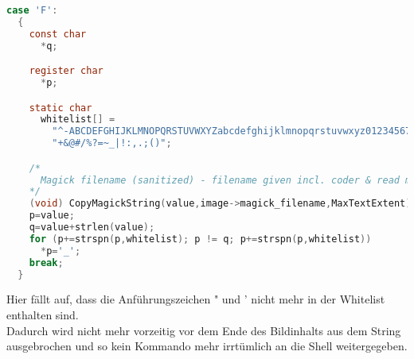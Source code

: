 \begin{lstlisting}[firstnumber=2610, language=C, caption=magick/property.c Gefilterte Wietergabe F-Parameter,label={lst:lstlisting}]
  case 'F':
  {
    const char
      *q;

    register char
      *p;

    static char
      whitelist[] =
        "^-ABCDEFGHIJKLMNOPQRSTUVWXYZabcdefghijklmnopqrstuvwxyz0123456789"
        "+&@#/%?=~_|!:,.;()";

    /*
      Magick filename (sanitized) - filename given incl. coder & read mods.
    */
    (void) CopyMagickString(value,image->magick_filename,MaxTextExtent);
    p=value;
    q=value+strlen(value);
    for (p+=strspn(p,whitelist); p != q; p+=strspn(p,whitelist))
      *p='_';
    break;
  }
\end{lstlisting}
\vspace{5mm}

Hier fällt auf, dass die Anführungszeichen " und ' nicht mehr in der Whitelist enthalten sind.\\

Dadurch wird nicht mehr vorzeitig vor dem Ende des Bildinhalts aus dem String ausgebrochen und so kein Kommando mehr irrtümlich an die Shell weitergegeben.